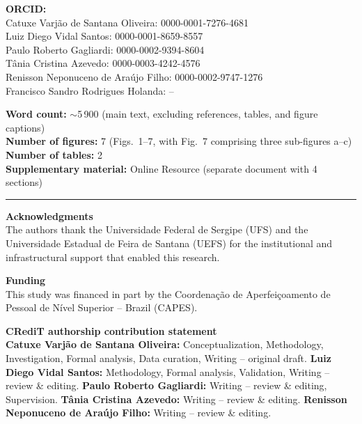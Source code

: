 \documentclass[12pt]{article}
\begin{document}
\vspace{18pt}

\noindent
\textbf{ORCID:}\\[4pt]
Catuxe Varj\~ao de Santana Oliveira: 0000-0001-7276-4681\\
Luiz Diego Vidal Santos: 0000-0001-8659-8557\\
Paulo Roberto Gagliardi: 0000-0002-9394-8604\\
T\^ania Cristina Azevedo: 0000-0003-4242-4576\\
Renisson Neponuceno de Ara\'ujo Filho: 0000-0002-9747-1276\\
Francisco Sandro Rodrigues Holanda: --

\vspace{24pt}

\noindent
\textbf{Word count:} $\sim$5\,900 (main text, excluding references, tables, and figure captions)\\[4pt]
\textbf{Number of figures:} 7 (Figs.\ 1--7, with Fig.\ 7 comprising three sub-figures a--c)\\[4pt]
\textbf{Number of tables:} 2\\[4pt]
\textbf{Supplementary material:} Online Resource (separate document with 4 sections)

\vspace{24pt}
\hrule
\vspace{12pt}

\noindent\textbf{Acknowledgments}\\[4pt]
The authors thank the Universidade Federal de Sergipe (UFS) and the Universidade Estadual de Feira de Santana (UEFS) for the institutional and infrastructural support that enabled this research.

\vspace{12pt}

\noindent\textbf{Funding}\\[4pt]
This study was financed in part by the Coordena\c{c}\~ao de Aperfei\c{c}oamento de Pessoal de N\'ivel Superior -- Brazil (CAPES).

\vspace{12pt}

\noindent\textbf{CRediT authorship contribution statement}\\[4pt]
\textbf{Catuxe Varj\~ao de Santana Oliveira:} Conceptualization, Methodology, Investigation, Formal analysis, Data curation, Writing -- original draft.
\textbf{Luiz Diego Vidal Santos:} Methodology, Formal analysis, Validation, Writing -- review \& editing.
\textbf{Paulo Roberto Gagliardi:} Writing -- review \& editing, Supervision.
\textbf{T\^ania Cristina Azevedo:} Writing -- review \& editing.
\textbf{Renisson Neponuceno de Ara\'ujo Filho:} Writing -- review \& editing.
\end{document}
